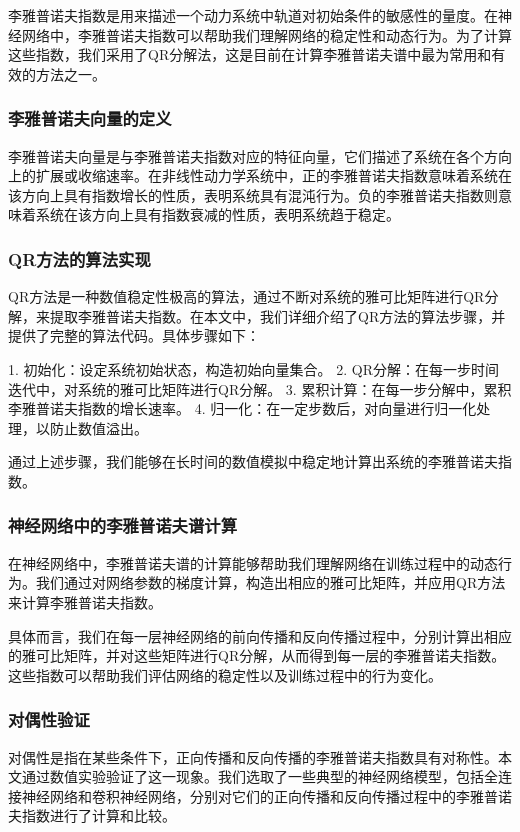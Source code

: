 \documentclass[12pt,a4paper]{amsart}
\begin{document}
李雅普诺夫指数是用来描述一个动力系统中轨道对初始条件的敏感性的量度。在神经网络中，李雅普诺夫指数可以帮助我们理解网络的稳定性和动态行为。为了计算这些指数，我们采用了QR分解法，这是目前在计算李雅普诺夫谱中最为常用和有效的方法之一。

\subsubsection{李雅普诺夫向量的定义}

李雅普诺夫向量是与李雅普诺夫指数对应的特征向量，它们描述了系统在各个方向上的扩展或收缩速率。在非线性动力学系统中，正的李雅普诺夫指数意味着系统在该方向上具有指数增长的性质，表明系统具有混沌行为。负的李雅普诺夫指数则意味着系统在该方向上具有指数衰减的性质，表明系统趋于稳定。

\subsubsection{QR方法的算法实现}

QR方法是一种数值稳定性极高的算法，通过不断对系统的雅可比矩阵进行QR分解，来提取李雅普诺夫指数。在本文中，我们详细介绍了QR方法的算法步骤，并提供了完整的算法代码。具体步骤如下：

1. 初始化：设定系统初始状态，构造初始向量集合。
2. QR分解：在每一步时间迭代中，对系统的雅可比矩阵进行QR分解。
3. 累积计算：在每一步分解中，累积李雅普诺夫指数的增长速率。
4. 归一化：在一定步数后，对向量进行归一化处理，以防止数值溢出。

通过上述步骤，我们能够在长时间的数值模拟中稳定地计算出系统的李雅普诺夫指数。

\subsubsection{神经网络中的李雅普诺夫谱计算}

在神经网络中，李雅普诺夫谱的计算能够帮助我们理解网络在训练过程中的动态行为。我们通过对网络参数的梯度计算，构造出相应的雅可比矩阵，并应用QR方法来计算李雅普诺夫指数。

具体而言，我们在每一层神经网络的前向传播和反向传播过程中，分别计算出相应的雅可比矩阵，并对这些矩阵进行QR分解，从而得到每一层的李雅普诺夫指数。这些指数可以帮助我们评估网络的稳定性以及训练过程中的行为变化。

\subsubsection{对偶性验证}

对偶性是指在某些条件下，正向传播和反向传播的李雅普诺夫指数具有对称性。本文通过数值实验验证了这一现象。我们选取了一些典型的神经网络模型，包括全连接神经网络和卷积神经网络，分别对它们的正向传播和反向传播过程中的李雅普诺夫指数进行了计算和比较。
\end{document}
